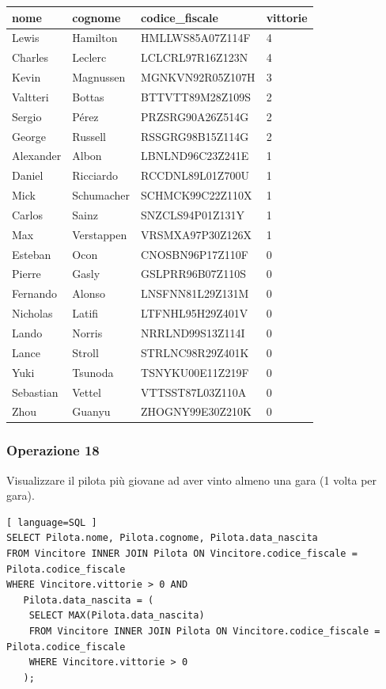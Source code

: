 \documentclass[11pt]{article}
\begin{document}
\begin{table}[!ht]
    \centering
    \begin{tabular}{|l|l|l|l|}
    \hline
        \textbf{nome} & \textbf{cognome} & \textbf{codice\_fiscale} & \textbf{vittorie} \\ \hline
        Lewis & Hamilton & HMLLWS85A07Z114F & 4 \\ \hline
        Charles & Leclerc & LCLCRL97R16Z123N & 4 \\ \hline
        Kevin & Magnussen & MGNKVN92R05Z107H & 3 \\ \hline
        Valtteri & Bottas & BTTVTT89M28Z109S & 2 \\ \hline
        Sergio & Pérez & PRZSRG90A26Z514G & 2 \\ \hline
        George & Russell & RSSGRG98B15Z114G & 2 \\ \hline
        Alexander & Albon & LBNLND96C23Z241E & 1 \\ \hline
        Daniel & Ricciardo & RCCDNL89L01Z700U & 1 \\ \hline
        Mick & Schumacher & SCHMCK99C22Z110X & 1 \\ \hline
        Carlos & Sainz & SNZCLS94P01Z131Y & 1 \\ \hline
        Max & Verstappen & VRSMXA97P30Z126X & 1 \\ \hline
        Esteban & Ocon & CNOSBN96P17Z110F & 0 \\ \hline
        Pierre & Gasly & GSLPRR96B07Z110S & 0 \\ \hline
        Fernando & Alonso & LNSFNN81L29Z131M & 0 \\ \hline
        Nicholas & Latifi & LTFNHL95H29Z401V & 0 \\ \hline
        Lando & Norris & NRRLND99S13Z114I & 0 \\ \hline
        Lance & Stroll & STRLNC98R29Z401K & 0 \\ \hline
        Yuki & Tsunoda & TSNYKU00E11Z219F & 0 \\ \hline
        Sebastian & Vettel & VTTSST87L03Z110A & 0 \\ \hline
        Zhou & Guanyu & ZHOGNY99E30Z210K & 0 \\ \hline
    \end{tabular}
\end{table}


\subsubsection{Operazione 18}
Visualizzare il pilota più giovane ad aver vinto almeno una gara (1 volta per gara).
\begin{lstlisting}[ language=SQL ]
SELECT Pilota.nome, Pilota.cognome, Pilota.data_nascita
FROM Vincitore INNER JOIN Pilota ON Vincitore.codice_fiscale = Pilota.codice_fiscale
WHERE Vincitore.vittorie > 0 AND
   Pilota.data_nascita = (
    SELECT MAX(Pilota.data_nascita)
    FROM Vincitore INNER JOIN Pilota ON Vincitore.codice_fiscale = Pilota.codice_fiscale
    WHERE Vincitore.vittorie > 0
   );
\end{lstlisting}
\end{document}
